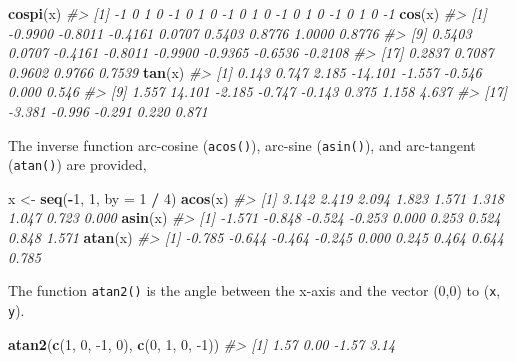 \documentclass[]{book}
\newenvironment{Shaded}{\begin{snugshade}}{\end{snugshade}}
\newcommand{\CommentTok}[1]{\textcolor[rgb]{0.56,0.35,0.01}{\textit{#1}}}
\newcommand{\DataTypeTok}[1]{\textcolor[rgb]{0.13,0.29,0.53}{#1}}
\newcommand{\DecValTok}[1]{\textcolor[rgb]{0.00,0.00,0.81}{#1}}
\newcommand{\KeywordTok}[1]{\textcolor[rgb]{0.13,0.29,0.53}{\textbf{#1}}}
\newcommand{\NormalTok}[1]{#1}
\newcommand{\OperatorTok}[1]{\textcolor[rgb]{0.81,0.36,0.00}{\textbf{#1}}}
\newcommand{\StringTok}[1]{\textcolor[rgb]{0.31,0.60,0.02}{#1}}
\theoremstyle{plain}
\theoremstyle{remark}
\begin{document}
\begin{Shaded}
\begin{Highlighting}[]
\KeywordTok{cospi}\NormalTok{(x)}
\CommentTok{#>  [1] -1  0  1  0 -1  0  1  0 -1  0  1  0 -1  0  1  0 -1  0  1  0 -1}
\KeywordTok{cos}\NormalTok{(x)}
\CommentTok{#>  [1] -0.9900 -0.8011 -0.4161  0.0707  0.5403  0.8776  1.0000  0.8776}
\CommentTok{#>  [9]  0.5403  0.0707 -0.4161 -0.8011 -0.9900 -0.9365 -0.6536 -0.2108}
\CommentTok{#> [17]  0.2837  0.7087  0.9602  0.9766  0.7539}
\KeywordTok{tan}\NormalTok{(x)}
\CommentTok{#>  [1]   0.143   0.747   2.185 -14.101  -1.557  -0.546   0.000   0.546}
\CommentTok{#>  [9]   1.557  14.101  -2.185  -0.747  -0.143   0.375   1.158   4.637}
\CommentTok{#> [17]  -3.381  -0.996  -0.291   0.220   0.871}
\end{Highlighting}
\end{Shaded}

The inverse function arc-cosine (\texttt{acos()}), arc-sine
(\texttt{asin()}), and arc-tangent (\texttt{atan()}) are provided,

\begin{Shaded}
\begin{Highlighting}[]
\NormalTok{x <-}\StringTok{ }\KeywordTok{seq}\NormalTok{(}\OperatorTok{-}\DecValTok{1}\NormalTok{, }\DecValTok{1}\NormalTok{, }\DataTypeTok{by =} \DecValTok{1} \OperatorTok{/}\StringTok{ }\DecValTok{4}\NormalTok{)}
\KeywordTok{acos}\NormalTok{(x)}
\CommentTok{#> [1] 3.142 2.419 2.094 1.823 1.571 1.318 1.047 0.723 0.000}
\KeywordTok{asin}\NormalTok{(x)}
\CommentTok{#> [1] -1.571 -0.848 -0.524 -0.253  0.000  0.253  0.524  0.848  1.571}
\KeywordTok{atan}\NormalTok{(x)}
\CommentTok{#> [1] -0.785 -0.644 -0.464 -0.245  0.000  0.245  0.464  0.644  0.785}
\end{Highlighting}
\end{Shaded}

The function \texttt{atan2()} is the angle between the x-axis and the
vector (0,0) to (\texttt{x}, \texttt{y}).

\begin{Shaded}
\begin{Highlighting}[]
\KeywordTok{atan2}\NormalTok{(}\KeywordTok{c}\NormalTok{(}\DecValTok{1}\NormalTok{, }\DecValTok{0}\NormalTok{, }\DecValTok{-1}\NormalTok{, }\DecValTok{0}\NormalTok{), }\KeywordTok{c}\NormalTok{(}\DecValTok{0}\NormalTok{, }\DecValTok{1}\NormalTok{, }\DecValTok{0}\NormalTok{, }\DecValTok{-1}\NormalTok{))}
\CommentTok{#> [1]  1.57  0.00 -1.57  3.14}
\end{Highlighting}
\end{Shaded}
\end{document}
